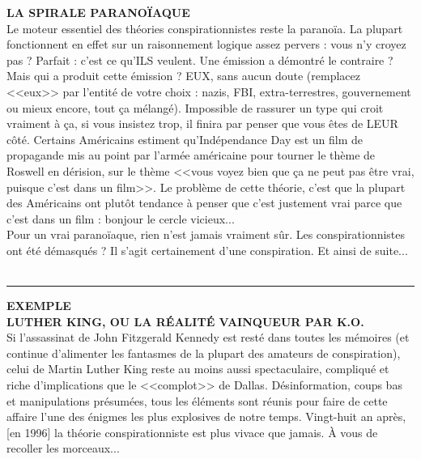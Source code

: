 \documentclass[11pt,twoside,a4paper]{article}
\begin{document}
\begin{multicols*}{2}
\textbf{\large LA SPIRALE PARANO{\"I}AQUE}~\\
Le moteur essentiel des th{\'e}ories conspirationnistes reste la parano{\"i}a. La plupart fonctionnent en effet sur un raisonnement logique assez pervers : vous n'y croyez pas ? Parfait : c'est ce qu'ILS veulent. Une {\'e}mission a d{\'e}montr{\'e} le contraire ? Mais qui a produit cette {\'e}mission ? EUX, sans aucun doute (remplacez <<eux>> par l'entit{\'e} de votre choix : nazis, FBI, extra-terrestres, gouvernement ou mieux encore, tout \c{c}a m{\'e}lang{\'e}). Impossible de rassurer un type qui croit vraiment {\`a} \c{c}a, si vous insistez trop, il finira par penser que vous {\^e}tes de LEUR c{\^o}t{\'e}. Certains Am{\'e}ricains estiment qu'Ind{\'e}pendance Day est un film de propagande mis au point par l'arm{\'e}e am{\'e}ricaine pour tourner le th{\`e}me de Roswell en d{\'e}rision, sur le th{\`e}me <<vous voyez bien que \c{c}a ne peut pas {\^e}tre vrai, puisque c'est dans un film>>. Le probl{\`e}me de cette th{\'e}orie, c'est que la plupart des Am{\'e}ricains ont plut{\^o}t tendance {\`a} penser que c'est justement vrai parce que c'est dans un film : bonjour le cercle vicieux... ~\\
Pour un vrai parano{\"i}aque, rien n'est jamais vraiment s{\^u}r. Les conspirationnistes ont {\'e}t{\'e} d{\'e}masqu{\'e}s ? Il s'agit certainement d'une conspiration. Et ainsi de suite... ~\\

\begin{center} \rule{0.45\textwidth}{0.01cm} \end{center}

\textbf{\Large EXEMPLE}~\\

\textbf{\large LUTHER KING, OU LA R{\'E}ALIT{\'E} VAINQUEUR PAR K.O.}~\\
Si l'assassinat de John Fitzgerald Kennedy est rest{\'e} dans toutes les m{\'e}moires (et continue d'alimenter les fantasmes de la plupart des amateurs de conspiration), celui de Martin Luther King reste au moins aussi spectaculaire, compliqu{\'e} et riche d'implications que le <<complot>> de Dallas. D{\'e}sinformation, coups bas et manipulations pr{\'e}sum{\'e}es, tous les {\'e}l{\'e}ments sont r{\'e}unis pour faire de cette affaire l'une des {\'e}nigmes les plus explosives de notre temps. Vingt-huit an apr{\`e}s, [en 1996] la th{\'e}orie conspirationniste est plus vivace que jamais. {\`A} vous de recoller les morceaux... ~\\


\end{multicols*}
\end{document}
